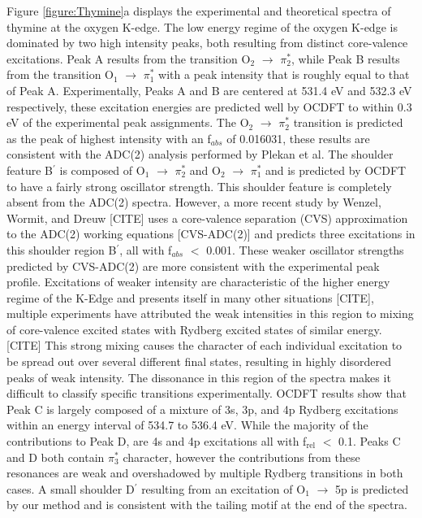 \documentclass[11.5pt]{article}
\begin{document}
Figure \ref{figure:Thymine}a displays the experimental and theoretical spectra of thymine at the oxygen K-edge. The low energy regime of the oxygen K-edge is dominated by two high intensity peaks, both resulting from distinct core-valence excitations. Peak A results from the transition O$_2$ $\rightarrow$ $\pi^*_2$, while Peak B results from the transition O$_1$ $\rightarrow$ $\pi^*_1$ with a peak intensity that is roughly equal to that of Peak A. Experimentally, Peaks A and B are centered at 531.4 eV and 532.3 eV respectively, these excitation energies are predicted well by OCDFT to within 0.3 eV of the experimental peak assignments. The  O$_2$ $\rightarrow$ $\pi_2^*$ transition is predicted as the peak of highest intensity with an f$_{abs}$ of 0.016031, these results are consistent with the ADC(2) analysis performed by Plekan et al. The shoulder feature B$^{\prime}$ is composed of O$_1$ $\rightarrow$ $\pi^*_2$ and O$_2$ $\rightarrow$ $\pi^*_1$ and is predicted by OCDFT to have a fairly strong oscillator strength. This shoulder feature is completely absent from the ADC(2) spectra. However, a more recent study by Wenzel, Wormit, and Dreuw [CITE] uses a core-valence separation (CVS) approximation to the ADC(2) working equations [CVS-ADC(2)] and predicts three excitations in this shoulder region B$^{\prime}$, all with f$_{abs}$ $<$ 0.001. These weaker oscillator strengths predicted by CVS-ADC(2) are more consistent with the experimental peak profile. Excitations of weaker intensity are characteristic of the higher energy regime of the K-Edge and presents itself in many other situations [CITE], multiple experiments have attributed the weak intensities in this region to mixing of core-valence excited states with Rydberg excited states of similar energy.[CITE] This strong mixing causes the character of each individual excitation to be spread out over several different final states, resulting in highly disordered peaks of weak intensity. The dissonance in this region of the spectra makes it difficult to classify specific transitions experimentally. OCDFT results show that Peak C is largely composed of a mixture of 3s, 3p, and 4p Rydberg excitations within an energy interval of 534.7 to 536.4 eV. While the majority of the contributions to Peak D, are 4s and 4p excitations all with f$_{\text{rel}}$ $<$ 0.1. Peaks C and D both contain $\pi^*_3$ character, however the contributions from these resonances are weak and overshadowed by multiple Rydberg transitions in both cases. A small shoulder D$^{\prime}$ resulting from an excitation of O$_1$ $\rightarrow$ 5p is predicted by our method and is consistent with the tailing motif at the end of the spectra. \\
\end{document}
